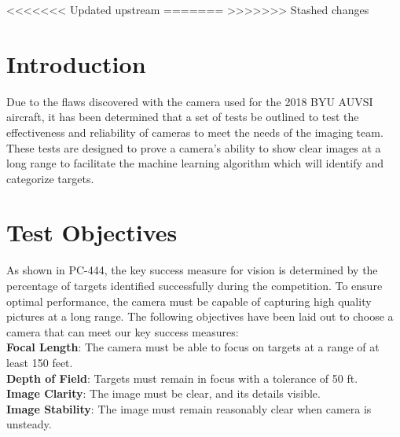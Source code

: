 \documentclass[]{auvsi_doc}
\begin{document}
\begin{AUVSITitlePage}
\begin{artifacttable}
<<<<<<< Updated upstream
=======
>>>>>>> Stashed changes
\end{artifacttable}
\end{AUVSITitlePage}

\section{Introduction}

Due to the flaws discovered with the camera used for the 2018 BYU AUVSI aircraft, it has been determined that a set of tests be outlined to test the effectiveness and reliability of cameras to meet the needs of the imaging team. These tests are designed to prove a camera’s ability to show clear images at a long range to facilitate the machine learning algorithm which will identify and categorize targets.

\section{Test Objectives}

As shown in PC-444, the key success measure for vision is determined by the percentage of targets identified 
successfully during the competition. To ensure optimal performance, the camera must be capable of capturing 
high quality pictures at a long range. The following objectives have been laid out to choose a camera that 
can meet our key success measures:\\

\textbf{Focal Length}: The camera must be able to focus on targets at a range of at least 150 feet.\\
\textbf{Depth of Field}: Targets must remain in focus with a tolerance of 50 ft.\\
\textbf{Image Clarity}: The image must be clear, and its details visible.\\
\textbf{Image Stability}: The image must remain reasonably clear when camera is unsteady.\\
\end{document}
